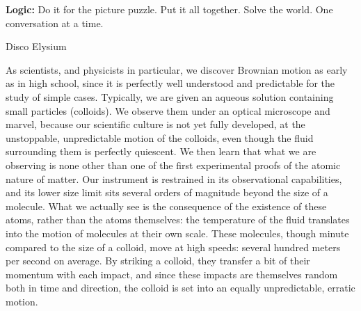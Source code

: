 \epigraph{\textcolor{Cerulean}{\bf{Logic:}} Do it for the picture puzzle. Put it all together. Solve the world. One conversation at a time.}{Disco Elysium}



As scientists, and physicists in particular, we discover Brownian motion as early as in high school, since it is perfectly well understood and predictable for the study of simple cases. Typically, we are given an aqueous solution containing small particles (colloids). We observe them under an optical microscope and marvel, because our scientific culture is not yet fully developed, at the unstoppable, unpredictable motion of the colloids, even though the fluid surrounding them is perfectly quiescent. We then learn that what we are observing is none other than one of the first experimental proofs of the atomic nature of matter. Our instrument is restrained in its observational capabilities, and its lower size limit sits several orders of magnitude beyond the size of a molecule. What we actually see is the consequence of the existence of these atoms, rather than the atoms themselves: the temperature of the fluid translates into the motion of molecules at their own scale. These molecules, though minute compared to the size of a colloid, move at high speeds: several hundred meters per second on average. By striking a colloid, they transfer a bit of their momentum with each impact, and since these impacts are themselves random both in time and direction, the colloid is set into an equally unpredictable, erratic motion.

